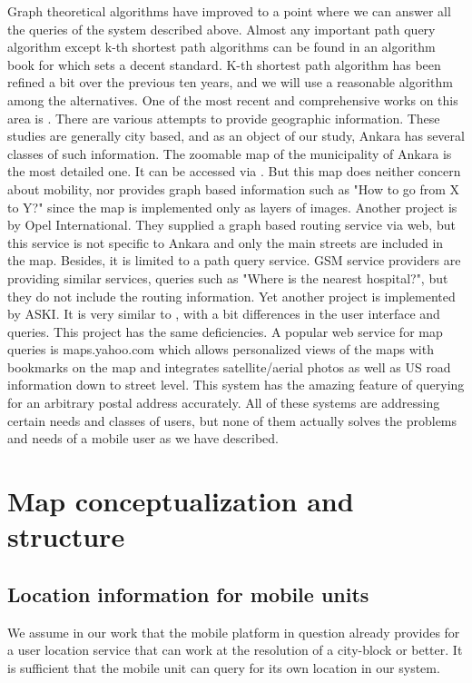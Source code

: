 \documentclass[a4paper,10pt]{article}
\begin{document}
Graph theoretical algorithms have improved to a point where we can
answer all the queries of the system described above. Almost any
important path query algorithm except k-th shortest path algorithms
can be found in an algorithm book for which \cite{algo} sets a decent
standard. K-th shortest path algorithm has been refined a bit over the
previous ten years, and we will use a reasonable algorithm among the
alternatives. One of the most recent and comprehensive works on this
area is \cite{eppstein}.  There are various attempts to provide
geographic information. These studies are generally city based, and as
an object of our study, Ankara has several classes of such
information.  The zoomable map of the municipality of Ankara is the
most detailed one. It can be accessed via \cite{burc}. But this map
does neither concern about mobility, nor provides graph based
information such as "How to go from X to Y?" since the map is
implemented only as layers of images. Another project is by Opel
International. \cite{opel} They supplied a graph based routing service
via web, but this service is not specific to Ankara and only the main
streets are included in the map.  Besides, it is limited to a path
query service. GSM service providers are providing similar services,
queries such as "Where is the nearest hospital?", but they do not
include the routing information.  Yet another project is implemented
by ASKI. \cite{aski} It is very similar to \cite{burc}, with a bit
differences in the user interface and queries. This project has the
same deficiencies. A popular web service for map queries is
maps.yahoo.com which allows personalized views of the maps with
bookmarks on the map and integrates satellite/aerial photos as well as
US road information down to street level. \cite{yahoo} This system has
the amazing feature of querying for an arbitrary postal address
accurately. All of these systems are addressing certain needs and
classes of users, but none of them actually solves the problems and
needs of a mobile user as we have described.


\section{Map conceptualization and structure}

\subsection{Location information for mobile units}

We assume in our work that the mobile platform in question already provides
for a user location service that can work at the resolution of a city-block
or better. It is sufficient that the mobile unit can query for its own
location in our system.
\end{document}
